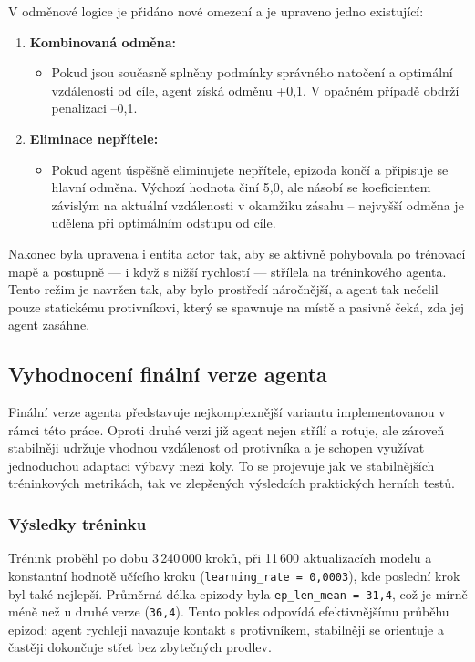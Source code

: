 V odměnové logice je přidáno nové omezení a je upraveno jedno existující:

\begin{enumerate}
\item \textbf{Kombinovaná odměna:}
\begin{itemize}
\item Pokud jsou současně splněny podmínky správného natočení a optimální vzdálenosti od cíle, agent získá odměnu +0{,}1. V opačném případě obdrží penalizaci –0{,}1.
\end{itemize}

\item \textbf{Eliminace nepřítele:}
\begin{itemize}
\item Pokud agent úspěšně eliminujete nepřítele, epizoda končí a připisuje se hlavní odměna. Výchozí hodnota činí 5{,}0, ale násobí se koeficientem závislým na aktuální vzdálenosti v okamžiku zásahu – nejvyšší odměna je udělena při optimálním odstupu od cíle.
\end{itemize}
\end{enumerate}

Nakonec byla upravena i entita actor  tak, aby se aktivně pohybovala po trénovací mapě a postupně — i když s nižší rychlostí — střílela na tréninkového agenta. Tento režim je navržen tak, aby bylo prostředí náročnější, a agent tak nečelil pouze statickému protivníkovi, který se spawnuje na místě a pasivně čeká, zda jej agent zasáhne.

\newpage

\subsection{Vyhodnocení finální verze agenta}

Finální verze agenta představuje nejkomplexnější variantu implementovanou v rámci této práce. Oproti druhé verzi již agent nejen střílí a rotuje, ale zároveň stabilněji udržuje vhodnou vzdálenost od protivníka a je schopen využívat jednoduchou adaptaci výbavy mezi koly. To se projevuje jak ve stabilnějších tréninkových metrikách, tak ve zlepšených výsledcích praktických herních testů.

\subsubsection{Výsledky tréninku}

Trénink proběhl po dobu 3\,240\,000 kroků, při 11\,600 aktualizacích modelu a konstantní hodnotě učícího kroku (\texttt{learning\_rate = 0{,}0003}), kde poslední krok byl také nejlepší. Průměrná délka epizody byla \texttt{ep\_len\_mean = 31{,}4}, což je mírně méně než u druhé verze (\texttt{36{,}4}). Tento pokles odpovídá efektivnějšímu průběhu epizod: agent rychleji navazuje kontakt s protivníkem, stabilněji se orientuje a častěji dokončuje střet bez zbytečných prodlev.

